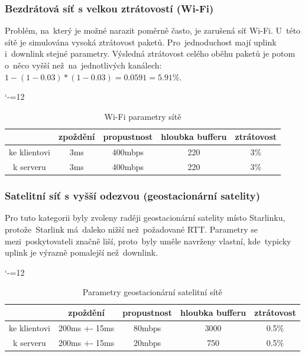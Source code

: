 \documentclass[a4paper,11pt]{article}
\begin{document}
\subsubsection{Bezdrátová síť s velkou ztrátovostí (Wi-Fi)}
Problém, na~který je možné narazit poměrně často, je zarušená síť Wi-Fi. U~této sítě je simulována vysoká ztrátovost paketů.
Pro~jednoduchost mají uplink i~downlink stejné parametry. Výsledná ztrátovost celého oběhu paketů je potom o~něco vyšší než~na~jednotlivých kanálech: $ 1 - (1 - 0.03)*(1 - 0.03) = 0.0591 = 5.91\% $.
\begin{table}[h]
\begin{center}
\catcode`-=12
\begin{tabular}{|c|cccc|} \hline
	& \textbf{zpoždění} & \textbf{propustnost} & \textbf{hloubka bufferu} & \textbf{ztrátovost} \\ \hline
    ke klientovi & 3ms & 400mbps & 220 & 3\% \\
    k serveru    & 3ms & 400mbps & 220 & 3\% \\ \hline
\end{tabular}
\caption{Wi-Fi parametry sítě}
\end{center}
\end{table}

\subsubsection{Satelitní síť s vyšší odezvou (geostacionární satelity)}
Pro tuto kategorii byly zvoleny raději geostacionární satelity místo Starlinku, protože~Starlink má~daleko nižší než~požadované RTT.
Parametry se mezi~poskytovateli značně liší, proto~byly uměle navrženy vlastní, kde~typicky uplink je výrazně pomalejší než~downlink.
\begin{table}[h]
\begin{center}
\catcode`-=12
\begin{tabular}{|c|cccc|} \hline
	& \textbf{zpoždění} & \textbf{propustnost} & \textbf{hloubka bufferu} & \textbf{ztrátovost} \\ \hline
	ke klientovi & 200ms +- 15ms & 80mbps & 3000 & 0.5\% \\
	k serveru    & 200ms +- 15ms & 20mbps & 750 & 0.5\% \\ \hline
\end{tabular}
\caption{Parametry geostacionární satelitní sítě}
\end{center}
\end{table}
\end{document}
